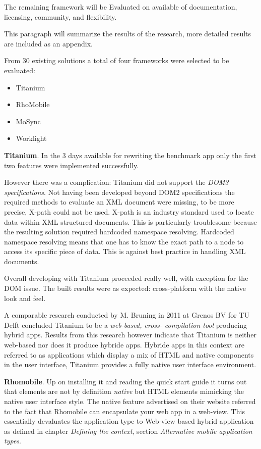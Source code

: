 The remaining framework will be Evaluated on available of documentation, licensing, community, and flexibility.

This paragraph will summarize the results of the research, more detailed results are included as an appendix. %

From 30 existing solutions a total of four frameworks were selected to be evaluated:
\begin{itemize}
	\item Titanium
	\item RhoMobile
	\item MoSync
	\item Worklight
\end{itemize}

{\bf Titanium}. In the 3 days available for rewriting the benchmark app only the first two features were implemented successfully.

However there was a complication: Titanium did not support the \emph{DOM3 specifications}. Not having been developed beyond DOM2 specifications the required methods to evaluate an XML document were missing, to be more precise, X-path could not be used. X-path is an industry standard used to locate data within XML structured documents. This is particularly troublesome because the resulting solution required hardcoded namespace resolving. Hardcoded namespace resolving means that one has to know the exact path to a node to access its specific piece of data. This is against best practice in handling XML documents. 

Overall developing with Titanium proceeded really well, with exception for the DOM issue. The built results were as expected: cross-platform with the native look and feel.

A comparable research conducted by M. Bruning in 2011 at Grenos BV for TU Delft concluded Titanium to be a \emph{web-based, cross- compilation tool} producing hybrid apps.\cite{Bruning2011} Results from this research however indicate that Titanium is neither web-based nor does it produce hybride apps. Hybride apps in this context are referred to as applications which display a mix of HTML and native components in the user interface, Titanium provides a fully native user interface environment.

{\bf Rhomobile}. Up on installing it and reading the quick start guide it turns out that elements are not by definition \emph{native} but HTML elements mimicking the native user interface style. The native feature advertised on their website referred to the fact that Rhomobile can encapsulate your web app in a web-view. This essentially devaluates the application type to Web-view based hybrid application as defined in chapter \emph{Defining the context}, section \emph{Alternative mobile application types}.

